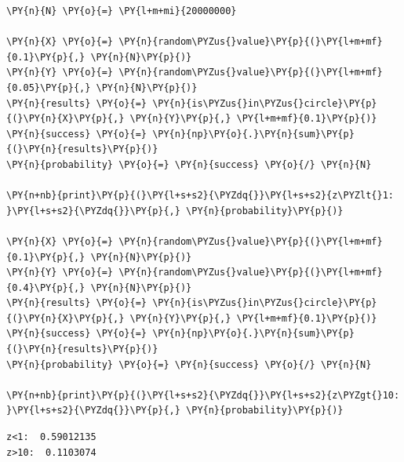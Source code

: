     \begin{tcolorbox}[breakable, size=fbox, boxrule=1pt, pad at break*=1mm,colback=cellbackground, colframe=cellborder]
\begin{Verbatim}[commandchars=\\\{\}]
\PY{n}{N} \PY{o}{=} \PY{l+m+mi}{20000000}

\PY{n}{X} \PY{o}{=} \PY{n}{random\PYZus{}value}\PY{p}{(}\PY{l+m+mf}{0.1}\PY{p}{,} \PY{n}{N}\PY{p}{)}
\PY{n}{Y} \PY{o}{=} \PY{n}{random\PYZus{}value}\PY{p}{(}\PY{l+m+mf}{0.05}\PY{p}{,} \PY{n}{N}\PY{p}{)}
\PY{n}{results} \PY{o}{=} \PY{n}{is\PYZus{}in\PYZus{}circle}\PY{p}{(}\PY{n}{X}\PY{p}{,} \PY{n}{Y}\PY{p}{,} \PY{l+m+mf}{0.1}\PY{p}{)}
\PY{n}{success} \PY{o}{=} \PY{n}{np}\PY{o}{.}\PY{n}{sum}\PY{p}{(}\PY{n}{results}\PY{p}{)}
\PY{n}{probability} \PY{o}{=} \PY{n}{success} \PY{o}{/} \PY{n}{N}

\PY{n+nb}{print}\PY{p}{(}\PY{l+s+s2}{\PYZdq{}}\PY{l+s+s2}{z\PYZlt{}1: }\PY{l+s+s2}{\PYZdq{}}\PY{p}{,} \PY{n}{probability}\PY{p}{)}

\PY{n}{X} \PY{o}{=} \PY{n}{random\PYZus{}value}\PY{p}{(}\PY{l+m+mf}{0.1}\PY{p}{,} \PY{n}{N}\PY{p}{)}
\PY{n}{Y} \PY{o}{=} \PY{n}{random\PYZus{}value}\PY{p}{(}\PY{l+m+mf}{0.4}\PY{p}{,} \PY{n}{N}\PY{p}{)}
\PY{n}{results} \PY{o}{=} \PY{n}{is\PYZus{}in\PYZus{}circle}\PY{p}{(}\PY{n}{X}\PY{p}{,} \PY{n}{Y}\PY{p}{,} \PY{l+m+mf}{0.1}\PY{p}{)}
\PY{n}{success} \PY{o}{=} \PY{n}{np}\PY{o}{.}\PY{n}{sum}\PY{p}{(}\PY{n}{results}\PY{p}{)}
\PY{n}{probability} \PY{o}{=} \PY{n}{success} \PY{o}{/} \PY{n}{N}

\PY{n+nb}{print}\PY{p}{(}\PY{l+s+s2}{\PYZdq{}}\PY{l+s+s2}{z\PYZgt{}10: }\PY{l+s+s2}{\PYZdq{}}\PY{p}{,} \PY{n}{probability}\PY{p}{)}
\end{Verbatim}
\end{tcolorbox}

    \begin{Verbatim}[commandchars=\\\{\}]
z<1:  0.59012135
z>10:  0.1103074
    \end{Verbatim}
